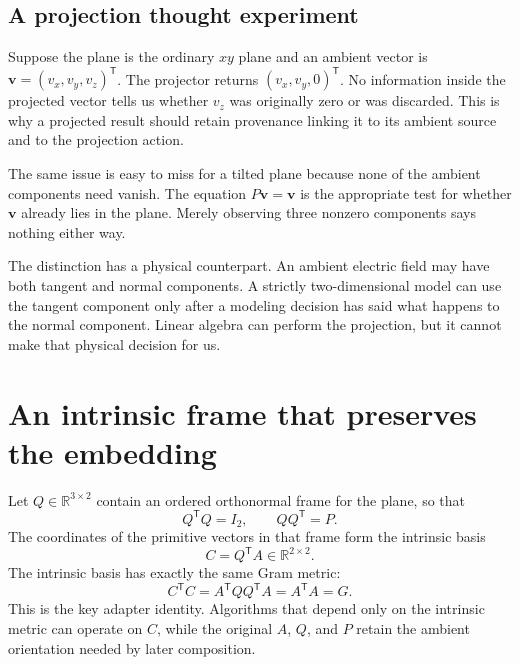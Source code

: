 \subsection{A projection thought experiment}

Suppose the plane is the ordinary $xy$ plane and an ambient vector is
$\mathbf v=(v_x,v_y,v_z)^{\mathsf T}$. The projector returns
$(v_x,v_y,0)^{\mathsf T}$. No information inside the projected vector tells us
whether $v_z$ was originally zero or was discarded. This is why a projected
result should retain provenance linking it to its ambient source and to the
projection action.

The same issue is easy to miss for a tilted plane because none of the ambient
components need vanish. The equation $P\mathbf v=\mathbf v$ is the appropriate
test for whether $\mathbf v$ already lies in the plane. Merely observing three
nonzero components says nothing either way.

The distinction has a physical counterpart. An ambient electric field may have
both tangent and normal components. A strictly two-dimensional model can use
the tangent component only after a modeling decision has said what happens to
the normal component. Linear algebra can perform the projection, but it cannot
make that physical decision for us.

\section{An intrinsic frame that preserves the embedding}

Let $Q\in\mathbb R^{3\times2}$ contain an ordered orthonormal frame for the
plane, so that
\begin{equation}
  Q^{\mathsf T}Q=I_2,
  \qquad
  QQ^{\mathsf T}=P.
  \label{eq:training-plane-frame}
\end{equation}
The coordinates of the primitive vectors in that frame form the intrinsic
basis
\begin{equation}
  C=Q^{\mathsf T}A\in\mathbb R^{2\times2}.
  \label{eq:training-intrinsic-adapter}
\end{equation}
The intrinsic basis has exactly the same Gram metric:
\begin{equation}
  C^{\mathsf T}C
  =A^{\mathsf T}QQ^{\mathsf T}A
  =A^{\mathsf T}A
  =G.
  \label{eq:training-adapter-metric-identity}
\end{equation}
This is the key adapter identity. Algorithms that depend only on the intrinsic
metric can operate on $C$, while the original $A$, $Q$, and $P$ retain the
ambient orientation needed by later composition.

